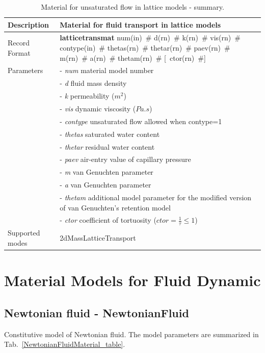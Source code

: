 \documentclass[a4paper]{article}
\newcommand{\descitem}[1]{{\noindent \bf #1}}
\newcommand{\elemparam}[2]{{{#1\tiny (#2)}~\#}}
\newcommand{\optelemparam}[2]{[{~\elemparam{#1}{#2}}]}
\newcommand{\param}[1]{{\it #1}}
\begin{document}
\begin{table}[!htb]
\begin{tabular}{|l|p{9cm}|}
\hline
Description & Material for fluid transport in lattice models\\
\hline
Record Format & 
\descitem{latticetransmat} 
\elemparam{num}{in}
\elemparam{d}{rn}
\elemparam{k}{rn} 
\elemparam{vis}{rn}
\elemparam{contype}{in}
\elemparam{thetas}{rn}
\elemparam{thetar}{rn}
\elemparam{paev}{rn}
\elemparam{m}{rn}
\elemparam{a}{rn}
\elemparam{thetam}{rn}
 \optelemparam{ctor}{rn}\\

Parameters 
&- \param{num} material model number\\
&- \param{d} fluid mass density\\
&- \param{k} permeability ($m^{2}$)\\
&- \param{vis} dynamic viscosity ($Pa.s$)\\
&- \param{contype} unsaturated flow allowed when contype=1\\
&- \param{thetas} saturated water content\\
&- \param{thetar} residual water content\\
&- \param{paev} air-entry value of capillary pressure\\
&- \param{m} van Genuchten parameter\\
&- \param{a} van Genuchten parameter\\
&- \param{thetam} additional model parameter for the modified version of van Genuchten’s retention model\\
&- \param{ctor} coefficient of tortuosity ($ctor=\frac{1}{\tau}\le1$)\\

Supported modes& 2dMassLatticeTransport\\
\hline
\end{tabular}

\caption{Material for unsaturated flow in lattice models - summary.}
\label{Iatticetransmat_table}
\end{table}



\clearpage

\section{Material Models for Fluid Dynamic}
\subsection{Newtonian fluid - NewtonianFluid}
\label{NewtonianFluidMaterial}
Constitutive model of Newtonian fluid. The model parameters are summarized
in Tab.~\ref{NewtonianFluidMaterial_table}.
\end{document}
